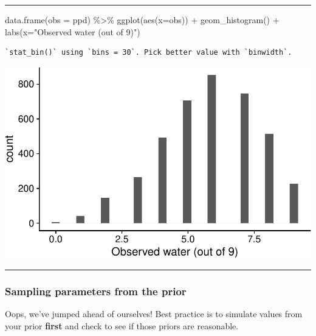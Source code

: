 \documentclass[
  letterpaper,
  DIV=11,
  numbers=noendperiod]{scrartcl}
\newenvironment{Shaded}{\begin{snugshade}}{\end{snugshade}}
\newcommand{\AttributeTok}[1]{\textcolor[rgb]{0.40,0.45,0.13}{#1}}
\newcommand{\FunctionTok}[1]{\textcolor[rgb]{0.28,0.35,0.67}{#1}}
\newcommand{\NormalTok}[1]{\textcolor[rgb]{0.00,0.23,0.31}{#1}}
\newcommand{\SpecialCharTok}[1]{\textcolor[rgb]{0.37,0.37,0.37}{#1}}
\newcommand{\StringTok}[1]{\textcolor[rgb]{0.13,0.47,0.30}{#1}}
\begin{document}
\begin{center}\rule{0.5\linewidth}{0.5pt}\end{center}

\begin{Shaded}
\begin{Highlighting}[]
\FunctionTok{data.frame}\NormalTok{(}\AttributeTok{obs =}\NormalTok{ ppd) }\SpecialCharTok{\%\textgreater{}\%} 
  \FunctionTok{ggplot}\NormalTok{(}\FunctionTok{aes}\NormalTok{(}\AttributeTok{x=}\NormalTok{obs)) }\SpecialCharTok{+}
  \FunctionTok{geom\_histogram}\NormalTok{() }\SpecialCharTok{+}
  \FunctionTok{labs}\NormalTok{(}\AttributeTok{x=}\StringTok{"Observed water (out of 9)"}\NormalTok{)}
\end{Highlighting}
\end{Shaded}

\begin{verbatim}
`stat_bin()` using `bins = 30`. Pick better value with `binwidth`.
\end{verbatim}

\includegraphics[width=17.1875in,height=\textheight]{lecture02-1_files/figure-pdf/unnamed-chunk-8-1.pdf}

\begin{center}\rule{0.5\linewidth}{0.5pt}\end{center}

\subsubsection{\texorpdfstring{Sampling parameters from the
\textbf{prior}}{Sampling parameters from the prior}}\label{sampling-parameters-from-the-prior}

Oops, we've jumped ahead of ourselves! Best practice is to simulate
values from your prior \textbf{first} and check to see if those priors
are reasonable.
\end{document}
